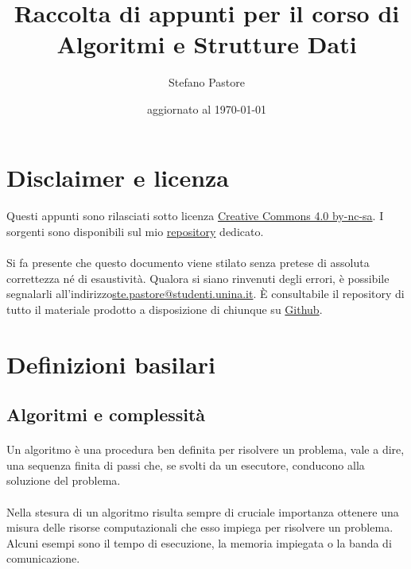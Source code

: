 \documentclass[11pt,a4paper,oneside]{article}
\title{Raccolta di appunti per il corso di\\\Huge{Algoritmi e Strutture Dati}}
\author{Stefano Pastore}
\date{\tiny{aggiornato al \today}}
\begin{document}
\maketitle
\pagebreak
\tableofcontents
\pagebreak

\section*{Disclaimer e licenza}
\paragraph*{} Questi appunti sono rilasciati sotto licenza \href{https://creativecommons.org/licenses/by-nc-sa/4.0/}{Creative Commons 4.0 by-nc-sa}. I sorgenti sono disponibili sul mio \href{http://bitbucket.org/}{repository} dedicato.
\paragraph*{} Si fa presente che questo documento viene stilato senza pretese di assoluta correttezza né di esaustività. Qualora si siano rinvenuti degli errori, è possibile segnalarli all'indirizzo\linebreak \href{mailto:ste.pastore@studenti.unina.it}{ste.pastore@studenti.unina.it}. È consultabile il repository di tutto il materiale prodotto a disposizione di chiunque su \href{https://github.com/stefano-pastore/asd}{Github}.
\pagebreak
\section{Definizioni basilari}
\subsection{Algoritmi e complessità}
\paragraph*{} Un algoritmo è una procedura ben definita per risolvere un problema, vale a dire, una sequenza finita di passi che, se svolti da un esecutore, conducono alla soluzione del problema.
\paragraph*{} Nella stesura di un algoritmo risulta sempre di cruciale importanza ottenere una misura delle risorse computazionali che esso impiega per risolvere un problema. Alcuni esempi sono il tempo di esecuzione, la memoria impiegata o la banda di comunicazione.
\end{document}
